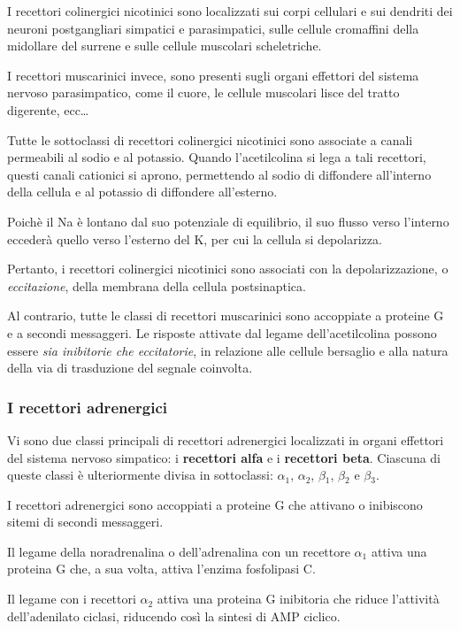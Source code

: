 \documentclass[]{article}
\begin{document}
I recettori colinergici nicotinici sono localizzati sui corpi cellulari
e sui dendriti dei neuroni postgangliari simpatici e parasimpatici,
sulle cellule cromaffini della midollare del surrene e sulle cellule
muscolari scheletriche.

I recettori muscarinici invece, sono presenti sugli organi effettori del
sistema nervoso parasimpatico, come il cuore, le cellule muscolari lisce
del tratto digerente, ecc\ldots{}

Tutte le sottoclassi di recettori colinergici nicotinici sono associate
a canali permeabili al sodio e al potassio. Quando l'acetilcolina si
lega a tali recettori, questi canali cationici si aprono, permettendo al
sodio di diffondere all'interno della cellula e al potassio di
diffondere all'esterno.

Poichè il Na è lontano dal suo potenziale di equilibrio, il suo flusso
verso l'interno eccederà quello verso l'esterno del K, per cui la
cellula si depolarizza.

Pertanto, i recettori colinergici nicotinici sono associati con la
depolarizzazione, o \emph{eccitazione}, della membrana della cellula
postsinaptica.

Al contrario, tutte le classi di recettori muscarinici sono accoppiate a
proteine G e a secondi messaggeri. Le risposte attivate dal legame
dell'acetilcolina possono essere \emph{sia inibitorie che eccitatorie},
in relazione alle cellule bersaglio e alla natura della via di
trasduzione del segnale coinvolta.

\subsubsection{I recettori adrenergici}\label{i-recettori-adrenergici}

Vi sono due classi principali di recettori adrenergici localizzati in
organi effettori del sistema nervoso simpatico: i \textbf{recettori
alfa} e i \textbf{recettori beta}. Ciascuna di queste classi è
ulteriormente divisa in sottoclassi: \(\alpha\)\(_1\), \(\alpha\)\(_2\),
\(\beta\)\(_1\), \(\beta\)\(_2\) e \(\beta\)\(_3\).

I recettori adrenergici sono accoppiati a proteine G che attivano o
inibiscono sitemi di secondi messaggeri.

Il legame della noradrenalina o dell'adrenalina con un recettore
\textbf{\(\alpha\)\(_1\)} attiva una proteina G che, a sua volta, attiva
l'enzima fosfolipasi C.

Il legame con i recettori \textbf{\(\alpha\)\(_2\)} attiva una proteina
G inibitoria che riduce l'attività dell'adenilato ciclasi, riducendo
così la sintesi di AMP ciclico.
\end{document}
